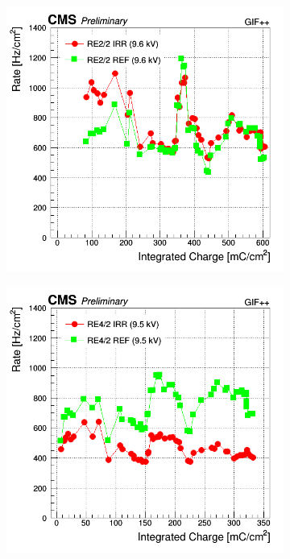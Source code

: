 \begin{figure}[H]
\begin{subfigure}{0.5\linewidth}
        	\caption{\label{fig:GIFpp-Source-mon:B}}
    	\end{subfigure}
    	\begin{subfigure}{0.5\linewidth}
    		\centering
			\includegraphics[width = \linewidth]{fig/chapt5/RE2-2-Source-Rate-vs-Time-9600.png}
        	\caption{\label{fig:GIFpp-Source-mon:C}}
    	\end{subfigure}
    	\begin{subfigure}{0.5\linewidth}
			\centering
    		\includegraphics[width = \linewidth]{fig/chapt5/RE4-2-Source-Rate-vs-Time-9500.png}

\end{subfigure}
\end{figure}
